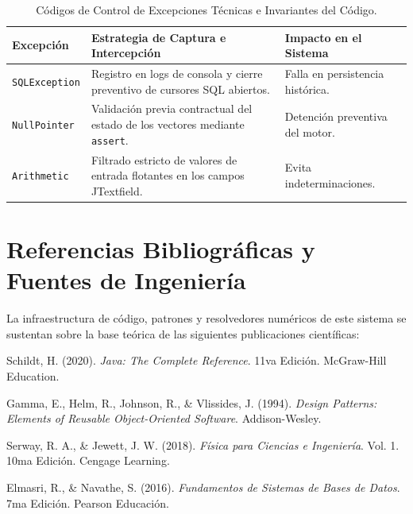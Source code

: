 \documentclass[11pt,a4paper]{article}
\begin{document}
	\begin{table}[htbp]
	\centering
	\caption{Códigos de Control de Excepciones Técnicas e Invariantes del Código.}
	\begin{tabular}{lp{6cm}l}
		\toprule
		\textbf{Excepción} & \textbf{Estrategia de Captura e Intercepción} & \textbf{Impacto en el Sistema} \\
		\midrule
		\texttt{SQLException} & Registro en logs de consola y cierre preventivo de cursores SQL abiertos. & Falla en persistencia histórica. \\
		\texttt{NullPointer} & Validación previa contractual del estado de los vectores mediante \texttt{assert}. & Detención preventiva del motor. \\
		\texttt{Arithmetic} & Filtrado estricto de valores de entrada flotantes en los campos JTextfield. & Evita indeterminaciones. \\
		\bottomrule
	\end{tabular}
	\label{tab:excepciones_backend}
	\end{table}
	
	\section{Referencias Bibliográficas y Fuentes de Ingeniería}
	La infraestructura de código, patrones y resolvedores numéricos de este sistema se sustentan sobre la base teórica de las siguientes publicaciones científicas:
	
	\begin{enumerate}[label={[ \arabic* ]}]
	\item Schildt, H. (2020). \textit{Java: The Complete Reference}. 11va Edición. McGraw-Hill Education.
	\item Gamma, E., Helm, R., Johnson, R., \& Vlissides, J. (1994). \textit{Design Patterns: Elements of Reusable Object-Oriented Software}. Addison-Wesley.
	\item Serway, R. A., \& Jewett, J. W. (2018). \textit{Física para Ciencias e Ingeniería}. Vol. 1. 10ma Edición. Cengage Learning.
	\item Elmasri, R., \& Navathe, S. (2016). \textit{Fundamentos de Sistemas de Bases de Datos}. 7ma Edición. Pearson Educación.
	\end{enumerate}
	
\end{document}
